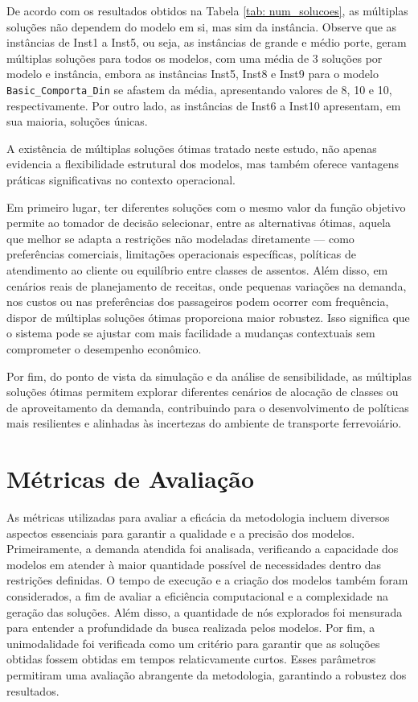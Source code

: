 De acordo com os resultados obtidos na Tabela \ref{tab: num_solucoes}, as múltiplas soluções não dependem do modelo em si, mas sim da instância. Observe que as instâncias de Inst1 a Inst5, ou seja, as instâncias de grande e médio porte, geram múltiplas soluções para todos os modelos, com uma média de 3 soluções por modelo e instância, embora as instâncias Inst5, Inst8 e Inst9 para o modelo \texttt{Basic\_Comporta\_Din} se afastem da média, apresentando valores de 8, 10 e 10, respectivamente. Por outro lado, as instâncias de Inst6 a Inst10 apresentam, em sua maioria, soluções únicas.

A existência de múltiplas soluções ótimas tratado neste estudo, não apenas evidencia a flexibilidade estrutural dos modelos, mas também oferece vantagens práticas significativas no contexto operacional.

Em primeiro lugar, ter diferentes soluções com o mesmo valor da função objetivo permite ao tomador de decisão selecionar, entre as alternativas ótimas, aquela que melhor se adapta a restrições não modeladas diretamente — como preferências comerciais, limitações operacionais específicas, políticas de atendimento ao cliente ou equilíbrio entre classes de assentos. Além disso, em cenários reais de planejamento de receitas, onde pequenas variações na demanda, nos custos ou nas preferências dos passageiros podem ocorrer com frequência, dispor de múltiplas soluções ótimas proporciona maior robustez. Isso significa que o sistema pode se ajustar com mais facilidade a mudanças contextuais sem comprometer o desempenho econômico.

Por fim, do ponto de vista da simulação e da análise de sensibilidade, as múltiplas soluções ótimas permitem explorar diferentes cenários de alocação de classes ou de aproveitamento da demanda, contribuindo para o desenvolvimento de políticas mais resilientes e alinhadas às incertezas do ambiente de transporte ferrevoiário.


\section{Métricas de Avaliação}
As métricas utilizadas para avaliar a eficácia da metodologia incluem diversos aspectos essenciais para garantir a qualidade e a precisão dos modelos. Primeiramente, a demanda atendida foi analisada, verificando a capacidade dos modelos em atender à maior quantidade possível de necessidades dentro das restrições definidas. O tempo de execução e a criação dos modelos também foram considerados, a fim de avaliar a eficiência computacional e a complexidade na geração das soluções. Além disso, a quantidade de nós explorados foi mensurada para entender a profundidade da busca realizada pelos modelos. Por fim, a unimodalidade foi verificada como um critério para garantir que as soluções obtidas fossem obtidas em tempos relaticvamente curtos. Esses parâmetros permitiram uma avaliação abrangente da metodologia, garantindo a robustez dos resultados.


